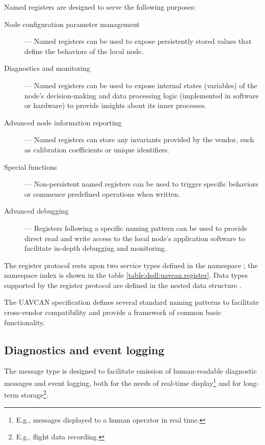 Named registers are designed to serve the following purposes:
\begin{description}
    \item[Node configuration parameter management] --- Named registers can be used to expose persistently stored
          values that define the behaviors of the local node.

    \item[Diagnostics and monitoring] --- Named registers can be used to expose internal states (variables) of
          the node's decision-making and data processing logic (implemented in software or hardware) to provide
          insights about its inner processes.

    \item[Advanced node information reporting] --- Named registers can store any invariants provided by the vendor,
          such as calibration coefficients or unique identifiers.

    \item[Special functions] --- Non-persistent named registers can be used to trigger specific behaviors or
          commence predefined operations when written.

    \item[Advanced debugging] --- Registers following a specific naming pattern can be used to provide direct read
          and write access to the local node's application software to facilitate in-depth debugging and monitoring.
\end{description}

The register protocol rests upon two service types defined in the namespace ;
the namespace index is shown in the table \ref{table:dsdl:uavcan.register}.
Data types supported by the register protocol are defined in the nested data structure
.

The UAVCAN specification defines several standard naming patterns to facilitate cross-vendor compatibility
and provide a framework of common basic functionality.


\subsection{Diagnostics and event logging}

The message type  is designed to facilitate emission of
human-readable diagnostic messages and event logging,
both for the needs of real-time display\footnote{E.g., messages displayed to a human operator in real time.}
and for long-term storage\footnote{E.g., flight data recording.}.

